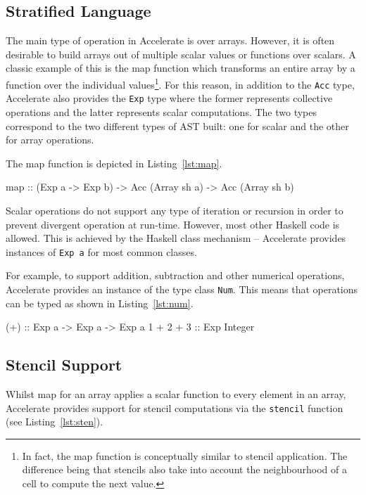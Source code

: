 \documentclass[12pt,a4paper,twoside]{scrbook}
\begin{document}
\subsection{Stratified Language}

The main type of operation in Accelerate is over arrays. However, it is often
desirable to build arrays out of multiple scalar values or functions over
scalars. A classic example of this is the map function which transforms an
entire array by a function over the individual values\footnote{In fact, the map
  function is conceptually similar to stencil application. The difference being
  that stencils also take into account the neighbourhood of a cell to compute
  the next value.}. For this reason, in addition to the \texttt{Acc} type,
Accelerate also provides the \texttt{Exp} type where the former represents
collective operations and the latter represents scalar computations. The two
types correspond to the two different types of AST built: one for scalar and the
other for array operations.

The map function is depicted in Listing~\ref{lst:map}.

\begin{hflisting}[label={lst:map}, caption=The type of the \texttt{map}
  operation as defined by Accelerate.]
map :: (Exp a -> Exp b) -> Acc (Array sh a)
       -> Acc (Array sh b)
\end{hflisting}

Scalar operations do not support any type of iteration or recursion in order to
prevent divergent operation at run-time. However, most other Haskell code is
allowed. This is achieved by the Haskell class mechanism -- Accelerate provides
instances of \texttt{Exp a} for most common classes.

For example, to support addition, subtraction and other numerical operations,
Accelerate provides an instance of the type class \texttt{Num}. This means that
operations can be typed as shown in Listing~\ref{lst:num}.

\begin{hflisting}[label={lst:num}, caption=The type of addition overloaded by Accelerate.]
(+) :: Exp a -> Exp a -> Exp a
1 + 2 + 3 :: Exp Integer
\end{hflisting}

\subsection{Stencil Support}

Whilst map for an array applies a scalar function to every element in an array,
Accelerate provides support for stencil computations via the \texttt{stencil}
function (see Listing~\ref{lst:sten}).
\end{document}
